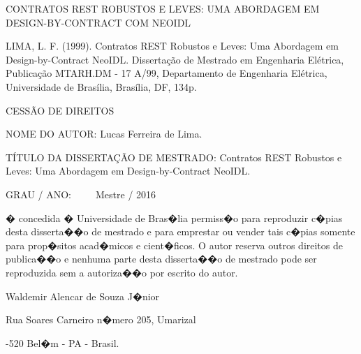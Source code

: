 \vspace{-1mm}

CONTRATOS REST ROBUSTOS E LEVES: UMA ABORDAGEM EM
DESIGN-BY-CONTRACT COM NEOIDL

\noindent    LIMA, L. F. (1999). Contratos REST Robustos e Leves: Uma
Abordagem em Design-by-Contract NeoIDL. Dissertação de Mestrado em Engenharia
Elétrica, Publicação MTARH.DM - 17 A/99, Departamento de Engenharia Elétrica,
Universidade de Brasília, Brasília, DF, 134p.



\vspace{6mm}

\noindent \begin{bf} \MakeUppercase{Cessão de Direitos} \end{bf}

\vspace{5mm}

\noindent NOME DO AUTOR: Lucas Ferreira de Lima.
\vspace{6mm}

\noindent TÍTULO DA DISSERTAÇÃO DE MESTRADO: Contratos REST Robustos e Leves: Uma
Abordagem em Design-by-Contract NeoIDL. 

\vspace{3mm}
\noindent GRAU / ANO:~ ~ ~ Mestre / 2016

\vspace{5mm}

\noindent � concedida � Universidade de Bras�lia permiss�o para reproduzir c�pias desta disserta��o de mestrado e para emprestar ou vender tais c�pias somente para prop�sitos acad�micos e cient�ficos. O autor reserva outros direitos de publica��o e nenhuma parte desta disserta��o de mestrado pode ser reproduzida sem a autoriza��o por escrito do autor.

\vspace{5mm}

\noindent \underline{\hspace{65mm}}

\vspace{-2mm}

\noindent  Waldemir Alencar de Souza J�nior
   \vspace{-2mm}

\noindent Rua Soares Carneiro n�mero 205, Umarizal 
    \vspace{-2mm}
    
-520 Bel�m - PA - Brasil.

\pagebreak


